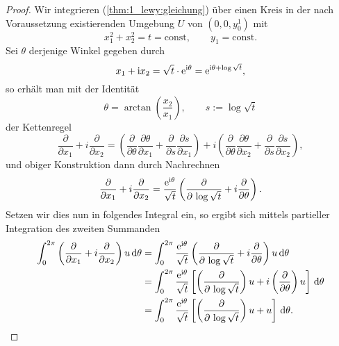 \begin{proof}
Wir integrieren (\ref{thm:1_lewy:gleichung}) über einen Kreis in der nach Voraussetzung existierenden Umgebung $U$ von $(0,0,y_0^1)$ mit 
\begin{equation}
x_1^2+x_2^2=t=\mathrm{const},\qquad y_1=\mathrm{const}.
\end{equation}
Sei $\theta$ derjenige Winkel gegeben durch
\begin{equation}
x_1+\mathrm i x_2=\sqrt{t}\cdot \mathrm e^{\mathrm i\theta} =\mathrm e^{\mathrm i\theta +\log\sqrt{t}},
\end{equation}
so erhält man mit der Identität
\begin{equation}
\theta=\arctan\left(\frac{x_2}{x_1}\right),\qquad s:=\log\sqrt{t}
\end{equation}
der Kettenregel 
\begin{equation}
\frac{\partial}{\partial x_1}+i\frac{\partial}{\partial x_2}
= \left(\frac{\partial}{\partial \theta} \frac{\partial\theta}{\partial x_1}+\frac{\partial}{\partial s}\frac{\partial s}{\partial x_1}\right)
+i \left(\frac{\partial}{\partial \theta} \frac{\partial\theta}{\partial x_2}+\frac{\partial}{\partial s}\frac{\partial s}{\partial x_2}\right),
\end{equation}
und obiger Konstruktion dann durch Nachrechnen
\begin{equation}\label{thm:1_lewy:proof1}
\frac{\partial}{\partial x_1} +i\frac{\partial}{\partial x_2}=\frac{\mathrm e^{\mathrm i\theta}}{\sqrt{t}} \left(\frac{\partial}{\partial \,\log \sqrt{t}}+i\frac{\partial}{\partial \theta}\right).
\end{equation}
Setzen wir dies nun in folgendes Integral ein, so ergibt sich mittels partieller Integration des zweiten Summanden
\begin{align}\label{thm:1_lewy:abl_gleich}
\begin{split}
\int_0^{2\pi} \left(\frac{\partial}{\partial x_1} +i\frac{\partial}{\partial x_2}\right)u\,\mathrm d\theta 
&= \int_0^{2\pi} \frac{\mathrm e^{\mathrm i\theta}}{\sqrt{t}} \left(\frac{\partial}{\partial \,\log \sqrt{t}}+i\frac{\partial}{\partial \theta}\right)u \,\mathrm d\theta \\
&= \int_0^{2\pi} \frac{\mathrm e^{\mathrm i\theta}}{\sqrt{t}} \left[ \left(\frac{\partial}{\partial \,\log \sqrt{t}}\right)u +i\left(\frac{\partial}{\partial \theta}\right)u\right]\,\mathrm d\theta \\
&= \int_0^{2\pi} \frac{\mathrm e^{\mathrm i\theta}}{\sqrt{t}} \left[ \left(\frac{\partial}{\partial \,\log \sqrt{t}}\right)u +u\right]\,\mathrm d\theta .
\end{split}
\end{align}

\end{proof}
